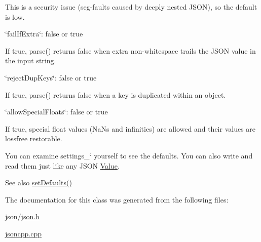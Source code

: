 \begin{DoxyItemize}
\begin{DoxyItemize}
\item This is a security issue (seg-\/faults caused by deeply nested J\+S\+ON), so the default is low.
\end{DoxyItemize}
\item {\ttfamily \char`\"{}fail\+If\+Extra\char`\"{}\+: false or true}
\begin{DoxyItemize}
\item If true, {\ttfamily parse()} returns false when extra non-\/whitespace trails the J\+S\+ON value in the input string.
\end{DoxyItemize}
\item {\ttfamily \char`\"{}reject\+Dup\+Keys\char`\"{}\+: false or true}
\begin{DoxyItemize}
\item If true, {\ttfamily parse()} returns false when a key is duplicated within an object.
\end{DoxyItemize}
\item {\ttfamily \char`\"{}allow\+Special\+Floats\char`\"{}\+: false or true}
\begin{DoxyItemize}
\item If true, special float values (Na\+Ns and infinities) are allowed and their values are lossfree restorable.
\end{DoxyItemize}
\end{DoxyItemize}

You can examine \textquotesingle{}settings\+\_\+` yourself to see the defaults. You can also write and read them just like any J\+S\+ON \hyperlink{classJson_1_1Value}{Value}. \begin{DoxySeeAlso}{See also}
\hyperlink{classJson_1_1CharReaderBuilder_a03ff031e06aabff989ab4addc87294ab_a03ff031e06aabff989ab4addc87294ab}{set\+Defaults()} 
\end{DoxySeeAlso}


The documentation for this class was generated from the following files\+:\begin{DoxyCompactItemize}
\item 
json/\hyperlink{json_8h}{json.\+h}\item 
\hyperlink{jsoncpp_8cpp}{jsoncpp.\+cpp}\end{DoxyCompactItemize}
